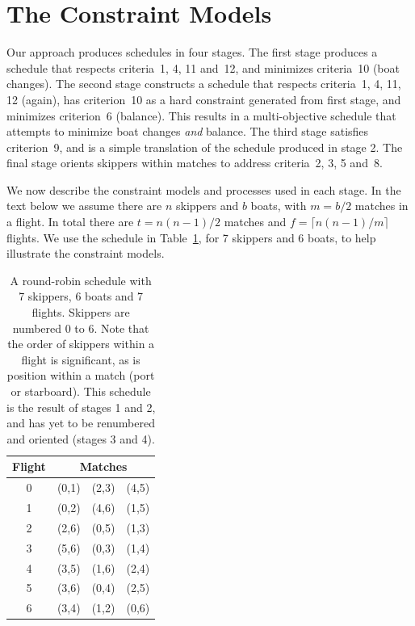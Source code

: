 \documentclass{llncs}
\begin{document}
\section{The Constraint Models}\label{sec:models}
Our approach produces schedules in four stages. The first stage produces a schedule that respects
criteria~1, 4, 11 and~12, and minimizes criteria~10 (boat changes). The second stage constructs a
schedule that respects criteria~1, 4, 11, 12 (again), has criterion~10 as a hard constraint generated
from first stage, and minimizes criterion~6 (balance). This results in a multi-objective schedule that attempts to
minimize boat changes \emph{and} balance. The third stage satisfies criterion~9, and is a simple
translation of the schedule produced in stage 2.  The final stage orients skippers within matches to
address criteria~2, 3, 5 and~8.

We now describe the constraint models and processes used in each stage. In the text below we assume
there are $n$ skippers and $b$ boats, with $m = b/2$ matches in a flight. In total there are $t =
n(n-1)/2$ matches and $f = \lceil n(n-1)/m  \rceil$ flights. We use the schedule in
Table~\ref{tab1}, for 7 skippers and 6 boats, to help illustrate the constraint models. 

\begin{table}
    \setlength{\tabcolsep}{3pt}
    \begin{tabular}{cccc}
        \toprule
        Flight & \multicolumn{3}{c}{Matches} \\ \midrule
        0 & (0,1) & (2,3) & (4,5) \\
        1 & (0,2) & (4,6) & (1,5) \\
        2 & (2,6) & (0,5) & (1,3) \\
        3 & (5,6) & (0,3) & (1,4) \\
        4 & (3,5) & (1,6) & (2,4) \\
        5 & (3,6) & (0,4) & (2,5) \\
        6 & (3,4) & (1,2) & (0,6) \\ \bottomrule
    \end{tabular}
    \caption{A round-robin schedule with 7 skippers, 6 boats and 7 flights.  Skippers are numbered 0
        to 6. Note that the order of skippers within a flight is significant, as is position within
        a match (port or starboard). This schedule is the result of stages 1 and 2, and has yet to
        be renumbered and oriented (stages 3 and 4).} \label{tab1}
\end{table}
\end{document}

